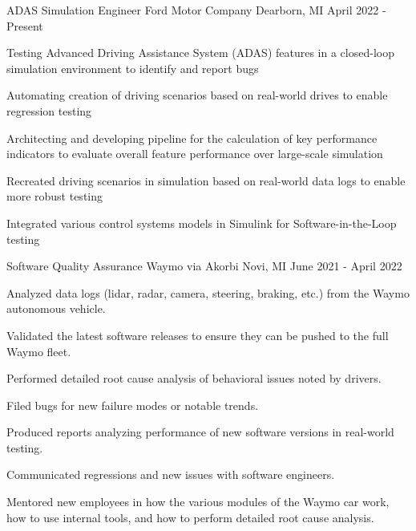 
\begin{cventries}
  \cventry
    {ADAS Simulation Engineer}
    {Ford Motor Company}
    {Dearborn, MI}
    {April 2022 - Present}
    {
       \begin{cvitems}
            \item {Testing Advanced Driving Assistance System (ADAS) features in a closed-loop simulation environment to identify and report bugs}
            \item {Automating creation of driving scenarios based on real-world drives to enable regression testing}
            \item {Architecting and developing pipeline for the calculation of key performance indicators to evaluate overall feature performance over large-scale simulation}
            \item {Recreated driving scenarios in simulation based on real-world data logs to enable more robust testing}
            \item {Integrated various control systems models in Simulink for Software-in-the-Loop testing}
       \end{cvitems}
    }
  \cventry
    {Software Quality Assurance} %
    {Waymo via Akorbi} %
    {Novi, MI} %
    {June 2021 - April 2022} %
    {
      \begin{cvitems} %
        \item {Analyzed data logs (lidar, radar, camera, steering, braking, etc.) from the Waymo autonomous vehicle.}
        \item {Validated the latest software releases to ensure they can be pushed to the full Waymo fleet.}
        \item {Performed detailed root cause analysis of behavioral issues noted by drivers.}
        \item {Filed bugs for new failure modes or notable trends.}
        \item {Produced reports analyzing performance of new software versions in real-world testing.}
        \item {Communicated regressions and new issues with software engineers.}
        \item {Mentored new employees in how the various modules of the Waymo car work, how to use internal tools, and how to perform detailed root cause analysis.}
      \end{cvitems}
    }
 
\end{cventries}
